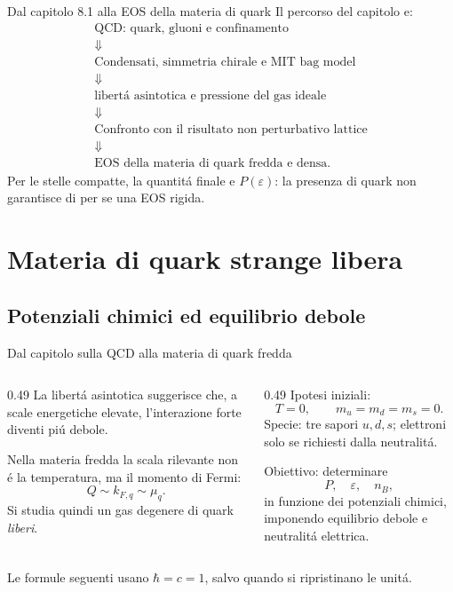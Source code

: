 \begin{frame}{Dal capitolo 8.1 alla EOS della materia di quark}
\small
Il percorso del capitolo e:
\[
\begin{gathered}
\text{QCD: quark, gluoni e confinamento}\\
\Downarrow\\
\text{Condensati, simmetria chirale e MIT bag model}\\
\Downarrow\\
\text{libert\'a asintotica e pressione del gas ideale}\\
\Downarrow\\
\text{Confronto con il risultato non perturbativo lattice}\\
\Downarrow\\
\text{EOS della materia di quark fredda e densa}.
\end{gathered}
\]
\medskip
Per le stelle compatte, la quantit\'a finale e $P(\varepsilon)$:
la presenza di quark non garantisce di per se una EOS rigida.
\end{frame}

\section{Materia di quark strange libera}

\subsection{Potenziali chimici ed equilibrio debole}

\begin{frame}[t]{Dal capitolo sulla QCD alla materia di quark fredda}
\small
\begin{columns}[T,onlytextwidth]
\begin{column}{0.49\textwidth}
La libert\'a asintotica suggerisce che, a scale energetiche elevate, l'interazione forte diventi pi\'u debole.

Nella materia fredda la scala rilevante non \'e la temperatura, ma il momento di Fermi:
\[
Q\sim k_{F,q}\sim\mu_q.
\]
Si studia quindi un gas degenere di quark \emph{liberi}.
\end{column}
\begin{column}{0.49\textwidth}
Ipotesi iniziali:
\[
T=0,\qquad m_u=m_d=m_s=0.
\]
Specie: tre sapori $u,d,s$; elettroni solo se richiesti dalla neutralit\'a.

Obiettivo: determinare
\[
P,\quad \varepsilon,\quad n_B,
\]
in funzione dei potenziali chimici, imponendo equilibrio debole e neutralit\'a elettrica.
\end{column}
\end{columns}
\medskip
Le formule seguenti usano $\hbar=c=1$, salvo quando si ripristinano le unit\'a.
\end{frame}

